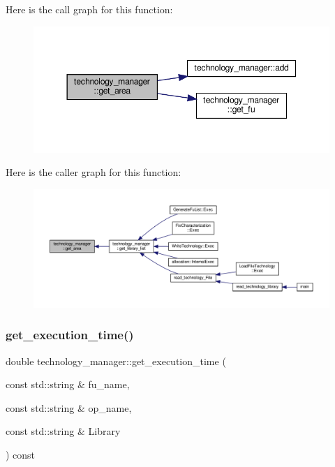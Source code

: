 Here is the call graph for this function\+:
\nopagebreak
\begin{figure}[H]
\begin{center}
\leavevmode
\includegraphics[width=350pt]{df/dc7/classtechnology__manager_ad5be680d6dcff25992d05aa9ca8652b9_cgraph}
\end{center}
\end{figure}
Here is the caller graph for this function\+:
\nopagebreak
\begin{figure}[H]
\begin{center}
\leavevmode
\includegraphics[width=350pt]{df/dc7/classtechnology__manager_ad5be680d6dcff25992d05aa9ca8652b9_icgraph}
\end{center}
\end{figure}
\mbox{\label{classtechnology__manager_ad7e2f48066e8764d8de84c9d9f9894c8}} 
\subsubsection{\texorpdfstring{get\+\_\+execution\+\_\+time()}{get\_execution\_time()}}
{\footnotesize\ttfamily double technology\+\_\+manager\+::get\+\_\+execution\+\_\+time (\begin{DoxyParamCaption}\item[{const std\+::string \&}]{fu\+\_\+name,  }\item[{const std\+::string \&}]{op\+\_\+name,  }\item[{const std\+::string \&}]{Library }\end{DoxyParamCaption}) const}



